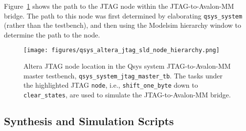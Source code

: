 \documentclass[10pt,twoside]{article}
\begin{document}
Figure~\ref{fig:qsys_system_sld_node} shows the path to the 
JTAG node within the JTAG-to-Avalon-MM bridge. The path to 
this node was first determined by elaborating \verb+qsys_system+
(rather than the testbench), and then using the Modelsim 
hierarchy window to determine the path to the node.

\clearpage
%
%
%
\begin{figure}[p]
  \begin{center}
    \texttt{[image: figures/qsys\_altera\_jtag\_sld\_node\_hierarchy.png]}
  \end{center}
  \caption{Altera JTAG node location in the Qsys system
  JTAG-to-Avalon-MM master testbench,
  {\tt qsys\_system\_jtag\_master\_tb}. The tasks under the
  highlighted JTAG {\tt node}, i.e., {\tt shift\_one\_byte} down
  to {\tt clear\_states},
  are used to simulate the JTAG-to-Avalon-MM bridge.}
  \label{fig:qsys_system_sld_node}
\end{figure}

\clearpage
\subsection{Synthesis and Simulation Scripts}
\end{document}
